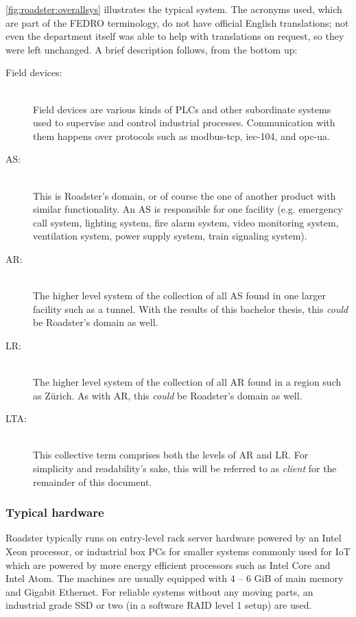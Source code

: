 \autoref{fig:roadster:overallsys} illustrates the typical system. The acronyms
used, which are part of the \gls{FEDRO} terminology, do not have official
English translations; not even the department itself was able to help with
translations on request, so they were left unchanged. A brief description
follows, from the bottom up:

\begin{description}
	\item [ Field devices: ] \hfill\\
	Field devices are various kinds of \glspl{PLC} and other subordinate systems
	used to supervise and control industrial processes. Communication with them
	happens over protocols such as \gls{modbus-tcp}, \gls{iec-104}, and
	\gls{opc-ua}.

	\item [ \gls{AS}: ] \hfill\\
	This is Roadster's domain, or of course the one of another product with similar
	functionality. An AS is responsible for one facility (e.g. emergency call system,
	lighting system, fire alarm system, video monitoring system, ventilation
	system, power supply system, train signaling system).

	\item [ \gls{AR}: ] \hfill\\
	The higher level system of the collection of all AS found in one larger
	facility such as a tunnel. With the results of this bachelor thesis, this
	\emph{could} be Roadster's domain as well.

	\item [ \gls{LR}: ] \hfill\\
	The higher level system of the collection of all AR found in a region such as
	Z\"urich. As with AR, this \emph{could} be Roadster's domain as well.

	\item [ \gls{LTA}: ] \hfill\\
	This collective term comprises both the levels of AR and LR. For
	simplicity and readability's sake, this will be referred to as
	\emph{client} for the remainder of this document.
\end{description}

\subsubsection{Typical hardware}
Roadster typically runs on entry-level rack server hardware powered by an
Intel\textregistered{} Xeon\textregistered{} processor, or industrial box PCs for smaller systems
commonly used for \gls{IoT} which are powered by more energy efficient processors
such as Intel\textregistered{} Core\textregistered{} and Intel\textregistered{}
Atom\texttrademark{}. The machines are usually equipped with 4 -- 6 GiB of main
memory and Gigabit Ethernet. For reliable systems without any moving parts, an
industrial grade \gls{SSD} or two (in a software \gls{RAID} level 1 setup) are used.


